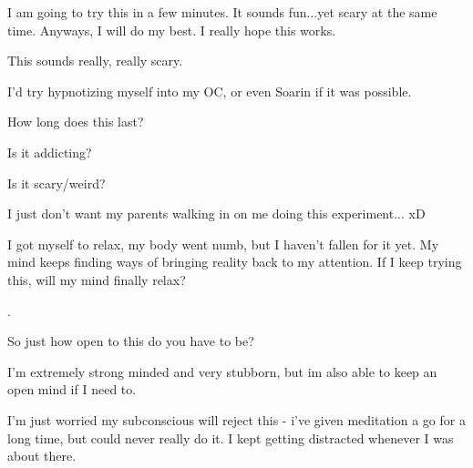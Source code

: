 \documentclass[ebook,12pt,oneside,openany]{memoir}
\begin{document}
\begin{tcolorbox}[title=Mr. Forest]
\par{I am going to try this in a few minutes.  It sounds fun...yet scary at the same time.  Anyways, I will do my best.  I really hope this works.}
\end{tcolorbox}
\begin{tcolorbox}[title=Dr. Vojislav Seselj]
\par{This sounds really, really scary.}
\par{I'd try hypnotizing myself into my OC, or even Soarin if it was possible.}
\par{How long does this last?}
\par{Is it addicting?}
\par{Is it scary/weird?}
\newline{}
\par{I just don't want my parents walking in on me doing this experiment... xD}
\end{tcolorbox}
\begin{tcolorbox}[title=Mr. Forest]
\par{I got myself to relax, my body went numb, but I haven't fallen for it yet.  My mind keeps finding ways of bringing reality back to my attention.  If I keep trying this, will my mind finally relax?}
\end{tcolorbox}
\begin{tcolorbox}[title=Ink]
\par{.}
\end{tcolorbox}
\begin{tcolorbox}[title=Agent505,colback=pink!5!white,colframe=pink!75!black,coltitle=white]
\par{So just how open to this do you have to be? }
\par{I'm extremely strong minded and very stubborn, but im also able to keep an open mind if I need to. }
\par{I'm just worried my subconscious will reject this - i've given meditation a go for a long time, but could never really do it. I kept getting distracted whenever I was about there. }
\end{tcolorbox}
\end{document}

